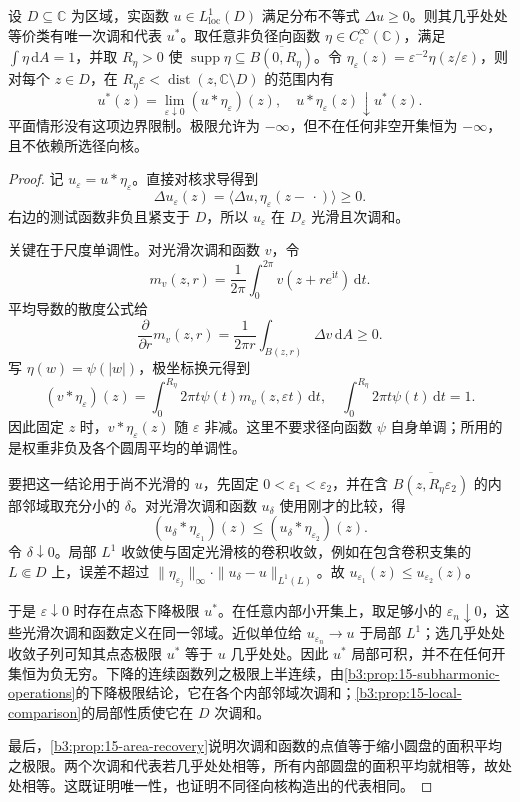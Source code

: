 \begin{theorem}[分布判据与点态代表]\label{b3:thm:15-distribution-subharmonic}
设 \(D\subseteq\mathbb C\) 为区域，实函数 \(u\in L^1_{\mathrm{loc}}(D)\) 满足分布不等式 \(\Delta u\ge0\)。则其几乎处处等价类有唯一次调和代表 \(u^*\)。取任意非负径向函数 \(\eta\in C_c^\infty(\mathbb C)\)，满足 \(\int\eta\,\mathrm{d}A=1\)，并取 \(R_\eta>0\) 使 \(\operatorname{supp}\eta\subseteq\overline{B(0,R_\eta)}\)。令 \(\eta_\varepsilon(z)=\varepsilon^{-2}\eta(z/\varepsilon)\)，则对每个 \(z\in D\)，在 \(R_\eta\varepsilon<\operatorname{dist}(z,\mathbb C\setminus D)\) 的范围内有
\[
 u^*(z)=\lim_{\varepsilon\downarrow0}(u*\eta_\varepsilon)(z),
 \quad u*\eta_\varepsilon(z)\downarrow u^*(z).
\]
平面情形没有这项边界限制。极限允许为 \(-\infty\)，但不在任何非空开集恒为 \(-\infty\)，且不依赖所选径向核。
\end{theorem}
\begin{proof}
记 \(u_\varepsilon=u*\eta_\varepsilon\)。直接对核求导得到
\[
 \Delta u_\varepsilon(z)
 =\langle\Delta u,\eta_\varepsilon(z-\,\cdot)\rangle\ge0.
\]
右边的测试函数非负且紧支于 \(D\)，所以 \(u_\varepsilon\) 在 \(D_\varepsilon\) 光滑且次调和。

关键在于尺度单调性。对光滑次调和函数 \(v\)，令
\[
 m_v(z,r)=\frac1{2\pi}\int_0^{2\pi}v(z+re^{\mathrm{i}t})\,\mathrm{d}t.
\]
平均导数的散度公式给
\[
 \frac{\partial}{\partial r}m_v(z,r)
 =\frac1{2\pi r}\int_{B(z,r)}\Delta v\,\mathrm{d}A\ge0.
\]
写 \(\eta(w)=\psi(|w|)\)，极坐标换元得到
\[
 (v*\eta_\varepsilon)(z)
 =\int_0^{R_\eta}2\pi t\psi(t)m_v(z,\varepsilon t)\,\mathrm{d}t,
 \quad \int_0^{R_\eta}2\pi t\psi(t)\,\mathrm{d}t=1.
\]
因此固定 \(z\) 时，\(v*\eta_\varepsilon(z)\) 随 \(\varepsilon\) 非减。这里不要求径向函数 \(\psi\) 自身单调；所用的是权重非负及各个圆周平均的单调性。

要把这一结论用于尚不光滑的 \(u\)，先固定 \(0<\varepsilon_1<\varepsilon_2\)，并在含 \(\overline{B(z,R_\eta\varepsilon_2)}\) 的内部邻域取充分小的 \(\delta\)。对光滑次调和函数 \(u_\delta\) 使用刚才的比较，得
\[
 (u_\delta*\eta_{\varepsilon_1})(z)
 \le(u_\delta*\eta_{\varepsilon_2})(z).
\]
令 \(\delta\downarrow0\)。局部 \(L^1\) 收敛使与固定光滑核的卷积收敛，例如在包含卷积支集的 \(L\Subset D\) 上，误差不超过 \(\|\eta_{\varepsilon_j}\|_\infty\cdot\|u_\delta-u\|_{L^1(L)}\)。故 \(u_{\varepsilon_1}(z)\le u_{\varepsilon_2}(z)\)。

于是 \(\varepsilon\downarrow0\) 时存在点态下降极限 \(u^*\)。在任意内部小开集上，取足够小的 \(\varepsilon_n\downarrow0\)，这些光滑次调和函数定义在同一邻域。近似单位给 \(u_{\varepsilon_n}\to u\) 于局部 \(L^1\)；选几乎处处收敛子列可知其点态极限 \(u^*\) 等于 \(u\) 几乎处处。因此 \(u^*\) 局部可积，并不在任何开集恒为负无穷。下降的连续函数列之极限上半连续，由\cref{b3:prop:15-subharmonic-operations}的下降极限结论，它在各个内部邻域次调和；\cref{b3:prop:15-local-comparison}的局部性质使它在 \(D\) 次调和。

最后，\cref{b3:prop:15-area-recovery}说明次调和函数的点值等于缩小圆盘的面积平均之极限。两个次调和代表若几乎处处相等，所有内部圆盘的面积平均就相等，故处处相等。这既证明唯一性，也证明不同径向核构造出的代表相同。
\end{proof}
